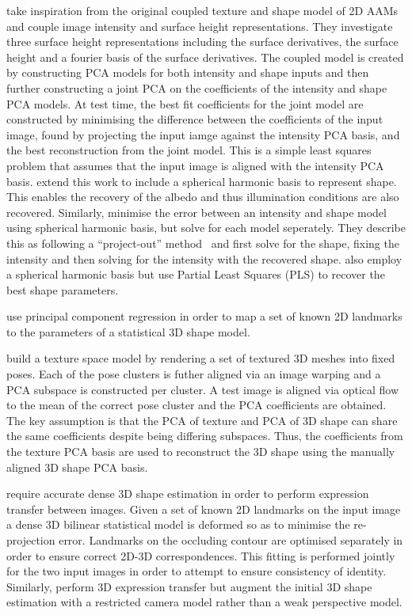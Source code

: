 \citet{castelan2007coupled} take inspiration from the original coupled 
texture and shape model of 2D AAMs~\cite{cootes2001active} and couple image
intensity and surface height representations. They investigate three surface
height representations including the surface derivatives, the surface height
and a fourier basis of the surface derivatives. The coupled model is created
by constructing PCA models for both intensity and shape inputs and then
further constructing a joint PCA on the coefficients of the intensity and shape
PCA models. At test time, the best fit coefficients for the joint model are
constructed by minimising the difference between the coefficients of
the input image, found by projecting the input iamge against the intensity PCA
basis, and the best reconstruction from the joint model. This is a simple
least squares problem that assumes that the input image is aligned
with the intensity PCA basis. \citet{ahmed2007new} extend this work to
include a spherical harmonic basis to represent shape. This enables
the recovery of the albedo and thus illumination conditions are also
recovered. Similarly, \citet{rara2009model} minimise the error between
an intensity and shape model using spherical harmonic basis, but solve for 
each model seperately. They describe this as following a ``project-out'' 
method~\cite{matthews2004active} and first solve for the shape, fixing the 
intensity and then solving for the intensity with the recovered shape. 
\citet{rara2010face} also employ a spherical harmonic basis but use
Partial Least Squares (PLS) to recover the best shape parameters.

\citet{rara2011model} use principal component regression in order to map
a set of known 2D landmarks to the parameters of a statistical 3D shape model.

\citet{kouzani1998example} build a texture space model by rendering a set of
textured 3D meshes into fixed poses. Each of the pose clusters is futher aligned
via an image warping and a PCA subspace is constructed per cluster. A test image
is aligned via optical flow to the mean of the correct pose cluster and the PCA
coefficients are obtained. The key assumption is that the PCA of texture and PCA
of 3D shape can share the same coefficients despite being differing subspaces.
Thus, the coefficients from the texture PCA basis are used to reconstruct the 3D
shape using the manually aligned 3D shape PCA basis.

\citet{Yang:2011gj} require accurate dense 3D shape estimation in order to
perform expression transfer between images. Given a set of known 2D landmarks on
the input image a dense 3D bilinear statistical model is deformed so as to
minimise the re-projection error. Landmarks on the occluding contour are
optimised separately in order to ensure correct 2D-3D correspondences. This
fitting is performed jointly for the two input images in order to attempt to
ensure consistency of identity.
Similarly, \citet{yang2012face} perform 3D expression transfer
but augment the initial 3D shape estimation with a restricted camera model
rather than a weak perspective model.

